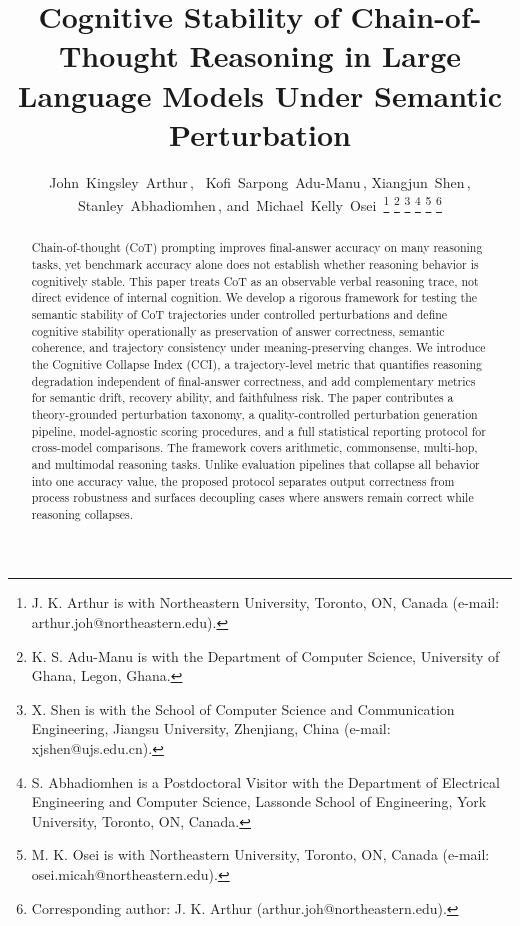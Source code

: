 \documentclass[conference]{IEEEtran}
\begin{document}
\title{Cognitive Stability of Chain-of-Thought Reasoning in Large Language Models Under Semantic Perturbation}

\author{John~Kingsley~Arthur\,,~
	Kofi~Sarpong~Adu-Manu\,,
	Xiangjun~Shen\,,
	Stanley~Abhadiomhen\,,
	and~Michael~Kelly~Osei\,
\thanks{J. K. Arthur is with Northeastern University, Toronto, ON, Canada (e-mail: arthur.joh@northeastern.edu).}%
\thanks{K. S. Adu-Manu is with the Department of Computer Science, University of Ghana, Legon, Ghana.}%
\thanks{X. Shen is with the School of Computer Science and Communication Engineering, Jiangsu University, Zhenjiang, China (e-mail: xjshen@ujs.edu.cn).}%
\thanks{S. Abhadiomhen is a Postdoctoral Visitor with the Department of Electrical Engineering and Computer Science, Lassonde School of Engineering, York University, Toronto, ON, Canada.}%
\thanks{M. K. Osei is with Northeastern University, Toronto, ON, Canada (e-mail: osei.micah@northeastern.edu).}%
\thanks{Corresponding author: J. K. Arthur (arthur.joh@northeastern.edu).}}

\maketitle

\begin{abstract}
Chain-of-thought (CoT) prompting improves final-answer accuracy on many reasoning tasks, yet benchmark accuracy alone does not establish whether reasoning behavior is cognitively stable. This paper treats CoT as an observable verbal reasoning trace, not direct evidence of internal cognition. We develop a rigorous framework for testing the semantic stability of CoT trajectories under controlled perturbations and define cognitive stability operationally as preservation of answer correctness, semantic coherence, and trajectory consistency under meaning-preserving changes. We introduce the Cognitive Collapse Index (CCI), a trajectory-level metric that quantifies reasoning degradation independent of final-answer correctness, and add complementary metrics for semantic drift, recovery ability, and faithfulness risk. The paper contributes a theory-grounded perturbation taxonomy, a quality-controlled perturbation generation pipeline, model-agnostic scoring procedures, and a full statistical reporting protocol for cross-model comparisons. The framework covers arithmetic, commonsense, multi-hop, and multimodal reasoning tasks. Unlike evaluation pipelines that collapse all behavior into one accuracy value, the proposed protocol separates output correctness from process robustness and surfaces decoupling cases where answers remain correct while reasoning collapses.
\end{abstract}
\end{document}
